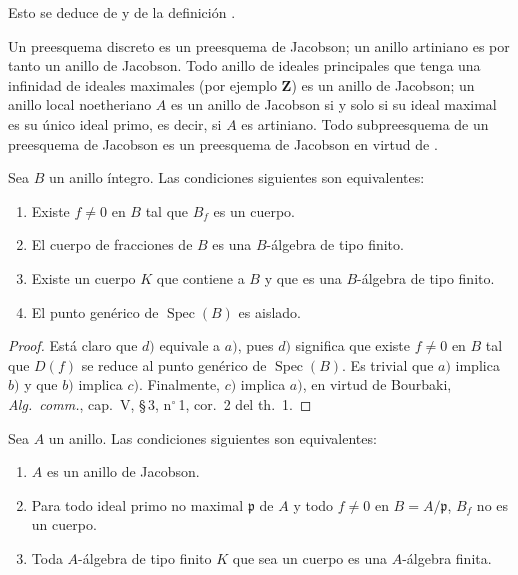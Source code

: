 Esto se deduce de  y de la definición .

\begin{env}[10.4.3]
\label{IV.10.4.3}
Un preesquema discreto es un preesquema de Jacobson; un anillo artiniano es por tanto un anillo de Jacobson.
Todo anillo de ideales principales que tenga una infinidad de ideales maximales (por ejemplo $\mathbf{Z}$) es un anillo de Jacobson; un anillo local noetheriano $A$ es un anillo de Jacobson si y solo si su ideal maximal es su único ideal primo, es decir, si $A$ es artiniano.
Todo subpreesquema de un preesquema de Jacobson es un preesquema de Jacobson en virtud de .
\end{env}

\begin{proposition}[10.4.4]
\label{IV.10.4.4}
Sea $B$ un anillo íntegro.
Las condiciones siguientes son equivalentes:
\begin{enumerate}[label=\emph{\alph*)}]
  \item Existe $f\neq 0$ en $B$ tal que $B_f$ es un cuerpo.
  \item El cuerpo de fracciones de $B$ es una $B$-álgebra de tipo finito.
  \item Existe un cuerpo $K$ que contiene a $B$ y que es una $B$-álgebra de tipo finito.
  \item El punto genérico de $\operatorname{Spec}(B)$ es aislado.
\end{enumerate}
\end{proposition}

\begin{proof}
Está claro que $d)$ equivale a $a)$, pues $d)$ significa que existe $f\neq 0$ en $B$ tal que $D(f)$ se reduce al punto genérico de $\operatorname{Spec}(B)$.
Es trivial que $a)$ implica $b)$ y que $b)$ implica $c)$.
Finalmente, $c)$ implica $a)$, en virtud de Bourbaki, \emph{Alg.\ comm.}, cap.~V, \S\,3, n$^\circ$\,1, cor.~2 del th.~1.
\end{proof}

\begin{proposition}[10.4.5]
\label{IV.10.4.5}
Sea $A$ un anillo.
Las condiciones siguientes son equivalentes:
\begin{enumerate}[label=\emph{\alph*)}]
  \item $A$ es un anillo de Jacobson.
  \item Para todo ideal primo no maximal $\mathfrak{p}$ de $A$ y todo $f\neq 0$ en $B=A/\mathfrak{p}$, $B_f$ no es un cuerpo.
  \item[\rm b$'$)] Toda $A$-álgebra de tipo finito $K$ que sea un cuerpo es una $A$-álgebra finita.
\end{enumerate}
\end{proposition}

